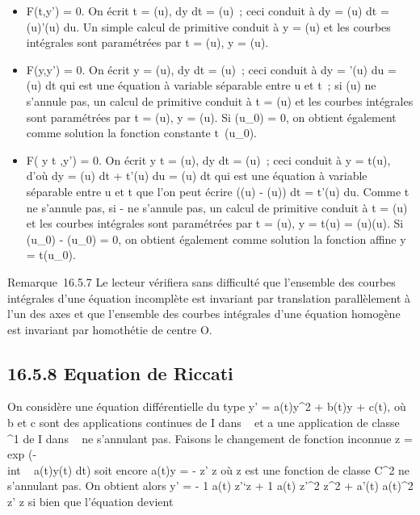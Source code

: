 \begin{itemize}
\itemsep1pt\parskip0pt
\item
  F(t,y') = 0. On écrit t = \phi(u),  dy \over dt =
  \psi(u)~; ceci conduit à dy = \psi(u) dt = \psi(u)\phi'(u) du. Un simple calcul de
  primitive conduit à y = \Psi(u) et les courbes intégrales sont
  paramétrées par t = \phi(u), y = \Psi(u).
\item
  F(y,y') = 0. On écrit y = \phi(u),  dy \over dt =
  \psi(u)~; ceci conduit à dy = \phi'(u) du = \psi(u) dt qui est une équation à
  variable séparable entre u et t~; si \psi(u) ne s'annule pas, un calcul
  de primitive conduit à t = \Phi(u) et les courbes intégrales sont
  paramétrées par t = \Phi(u), y = \psi(u). Si \phi(u_0) = 0, on obtient
  également comme solution la fonction constante
  t\mapsto~\phi(u_0).
\item
  F( y \over t ,y') = 0. On écrit  y
  \over t = \phi(u),  dy \over dt =
  \psi(u)~; ceci conduit à y = t\phi(u), d'où dy = \phi(u) dt + t\phi'(u) du = \psi(u)
  dt qui est une équation à variable séparable entre u et t que l'on
  peut écrire (\psi(u) - \phi(u)) dt = t\phi'(u) du. Comme t ne s'annule pas, si
  \psi - \phi ne s'annule pas, un calcul de primitive conduit à t = \Phi(u) et
  les courbes intégrales sont paramétrées par t = \Phi(u), y = t\psi(u) =
  \Phi(u)\psi(u). Si \psi(u_0) - \phi(u_0) = 0, on obtient
  également comme solution la fonction affine y = t\phi(u_0).
\end{itemize}

Remarque~16.5.7 Le lecteur vérifiera sans difficulté que l'ensemble des
courbes intégrales d'une équation incomplète est invariant par
translation parallèlement à l'un des axes et que l'ensemble des courbes
intégrales d'une équation homogène est invariant par homothétie de
centre O.

\subsection{16.5.8 Equation de Riccati}

On considère une équation différentielle du type y' = a(t)y^2
+ b(t)y + c(t), où b et c sont des applications continues de I dans ~ et
a une application de classe ^1 de I dans ~ ne s'annulant
pas. Faisons le changement de fonction inconnue z
= exp (-\\int ~ a(t)y(t)
dt) soit encore a(t)y = - z' \over z où z est une
fonction de classe C^2 ne s'annulant pas. On obtient alors y'
= - 1 \over a(t)  z'`\over z + 1
\over a(t)  z'^2 \over
z^2 + a'(t) \over a(t)^2 
z' \over z si bien que l'équation devient

